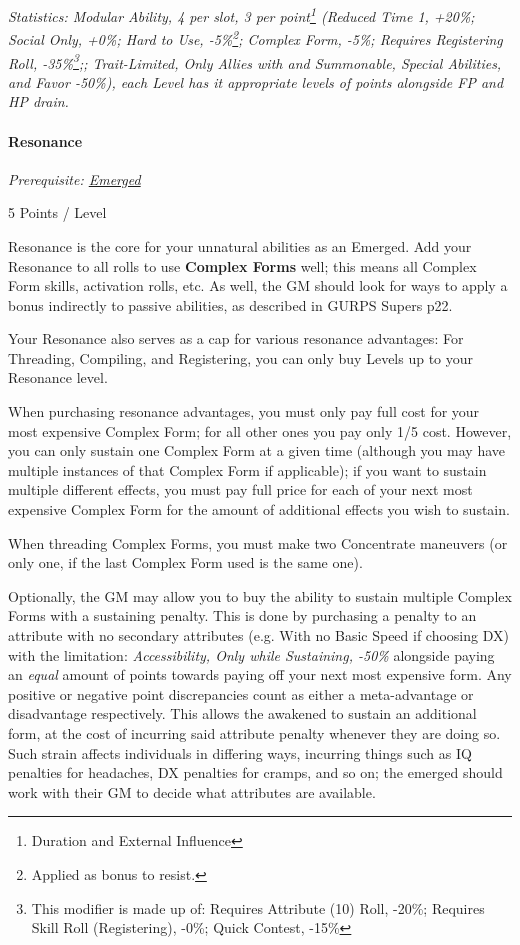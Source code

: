 \begin{multicols*}{3}
	\textit{\textcolor{OliveGreen}{Statistics: Modular Ability, 4 per slot, 3 per point\footnote{Duration and External Influence} (Reduced Time 1, +20\%; Social Only, +0\%; Hard to Use, -5\%\footnote{Applied as bonus to resist.}; Complex Form, -5\%; Requires Registering Roll, -35\%\footnote{This modifier is made up of: Requires Attribute (10) Roll, -20\%; Requires Skill Roll (Registering), -0\%; Quick Contest, -15\%};; Trait-Limited, Only Allies with and Summonable, Special Abilities, and Favor -50\%), each Level has it appropriate levels of points alongside FP and HP drain.}}
	
	\paragraph{Resonance}
	\textit{Prerequisite: \hyperref[emerged]{Emerged}}
	\begin{flushright}
		5 Points / Level
	\end{flushright}
	
	Resonance is the core for your unnatural abilities as an Emerged. Add your Resonance to all rolls to use \textbf{Complex Forms} well; this means all Complex Form skills, activation rolls, etc. As well, the GM should look for ways to apply a bonus indirectly to passive abilities, as described in GURPS Supers p22.
	
	Your Resonance also serves as a cap for various resonance advantages: For Threading, Compiling, and Registering, you can only buy Levels up to your Resonance level.
	
	When purchasing resonance advantages, you must only pay full cost for your most expensive Complex Form; for all other ones you pay only 1/5 cost. However, you can only sustain one Complex Form at a given time (although you may have multiple instances of that Complex Form if applicable); if you want to sustain multiple different effects, you must pay full price for each of your next most expensive Complex Form for the amount of additional effects you wish to sustain.
	
	When threading Complex Forms, you must make two Concentrate maneuvers (or only one, if the last Complex Form used is the same one).
	
	Optionally, the GM may allow you to buy the ability to sustain multiple Complex Forms with a sustaining penalty. This is done by purchasing a penalty to an attribute with no secondary attributes (e.g. With no Basic Speed if choosing DX) with the limitation: \textit{Accessibility, Only while Sustaining, -50\%} alongside paying an \textit{equal} amount of points towards paying off your next most expensive form. Any positive or negative point discrepancies count as either a meta-advantage or disadvantage respectively. This allows the awakened to sustain an additional form, at the cost of incurring said attribute penalty whenever they are doing so. Such strain affects individuals in differing ways, incurring things such as IQ penalties for headaches, DX penalties for cramps, and so on; the emerged should work with their GM to decide what attributes are available. 
	

\end{multicols*}
